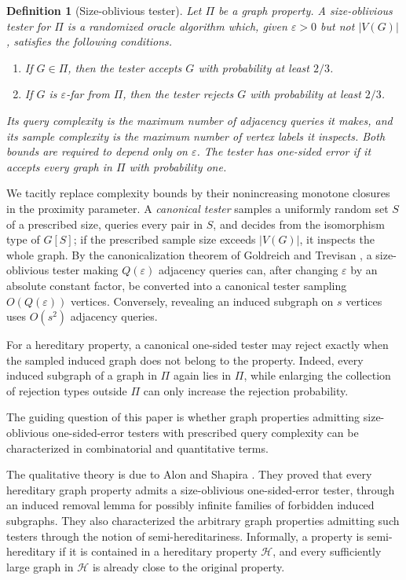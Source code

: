 \documentclass[11pt,reqno,letterpaper]{amsart}
\newcommand{\cH}{{\mathcal H}}
\theoremstyle{plain}
\newtheorem{defn}[thm]{Definition}
\theoremstyle{remark}
\begin{document}
\begin{defn}[Size-oblivious tester]
Let $\Pi$ be a graph property.  A \textit{size-oblivious tester} for $\Pi$ is a
randomized oracle algorithm which, given $\varepsilon>0$ but not $|V(G)|$,
satisfies the following conditions.
\begin{enumerate}[label=\textnormal{(\roman*)}]
\item If $G\in\Pi$, then the tester accepts $G$ with probability at least
$2/3$.
\item If $G$ is $\varepsilon$-far from $\Pi$, then the tester rejects $G$
with probability at least $2/3$.
\end{enumerate}
Its \textit{query complexity} is the maximum number of adjacency queries it
makes, and its \textit{sample complexity} is the maximum number of vertex
labels it inspects.  Both bounds are required to depend only on $\varepsilon$.
The tester has \textit{one-sided error} if it accepts every graph in $\Pi$ with
probability one.
\end{defn}

We tacitly replace complexity bounds by their nonincreasing monotone closures
in the proximity parameter.  A \textit{canonical tester} samples a uniformly
random set $S$ of a prescribed size, queries every pair in $S$, and decides
from the isomorphism type of $G[S]$; if the prescribed sample size exceeds
$|V(G)|$, it inspects the whole graph.  By the canonicalization theorem of
Goldreich and Trevisan \cite{goldreichTrevisan2003three}, a size-oblivious
tester making $Q(\varepsilon)$ adjacency queries can, after changing
$\varepsilon$ by an absolute constant factor, be converted into a canonical
tester sampling $O(Q(\varepsilon))$ vertices.  Conversely, revealing an
induced subgraph on $s$ vertices uses $O(s^2)$ adjacency queries.

For a hereditary property, a canonical one-sided tester may reject exactly
when the sampled induced graph does not belong to the property.  Indeed, every
induced subgraph of a graph in $\Pi$ again lies in $\Pi$, while enlarging the
collection of rejection types outside $\Pi$ can only increase the rejection
probability.

The guiding question of this paper is whether graph properties admitting
size-oblivious one-sided-error testers with prescribed query complexity can be
characterized in combinatorial and quantitative terms.

The qualitative theory is due to Alon and Shapira \cite{AlonShapira}. They proved that every hereditary graph property admits a size-oblivious one-sided-error tester, through an induced removal lemma for possibly infinite families of forbidden induced subgraphs. They also characterized the arbitrary graph properties admitting such testers through the notion of semi-hereditariness. Informally, a property is semi-hereditary if it is contained in a hereditary property $\cH$, and every sufficiently large graph in $\cH$ is already close to the original property.
\end{document}
